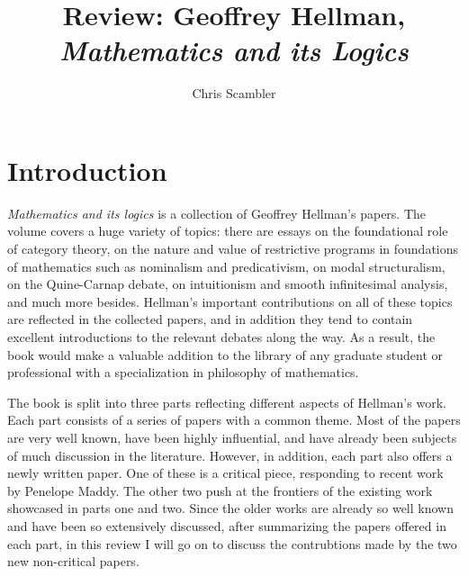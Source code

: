\documentclass{asl}
\title{Review: Geoffrey Hellman, \emph{Mathematics and its Logics}}
\author{Chris Scambler}
\theoremstyle{definition}
\begin{document}
 
\maketitle

\section{Introduction}
\emph{Mathematics and its logics} is a collection of Geoffrey Hellman's papers. 
The volume covers a huge variety of topics:
there are essays on the foundational role of category theory, 
on the nature and value of restrictive programs in foundations of mathematics such as nominalism and predicativism, 
on modal structuralism, on the Quine-Carnap debate, 
on intuitionism and smooth infinitesimal analysis, 
and much more besides. 
Hellman's important contributions on all of these topics are reflected in the collected papers, 
and in addition they tend to contain excellent introductions to the relevant debates along the way.
As a result, 
the book would make a valuable addition to the library of any graduate student or professional with a specialization in philosophy of mathematics. 

The book is split into three parts reflecting different aspects of Hellman's work. 
Each part consists of a series of papers with a common theme.
Most of the papers are very well known, have been highly influential, 
and have already been subjects of much discussion in the literature.
However, in addition, 
each part also offers a newly written paper.
One of these is a critical piece, responding to recent work by Penelope Maddy. 
The other two push at the frontiers of the existing work showcased in parts one and two.
Since the older works are already so well known and have been so extensively discussed, 
after summarizing the papers offered in each part, 
in this review I will go on to discuss the contrubtions made by the two new non-critical papers.
\end{document}

